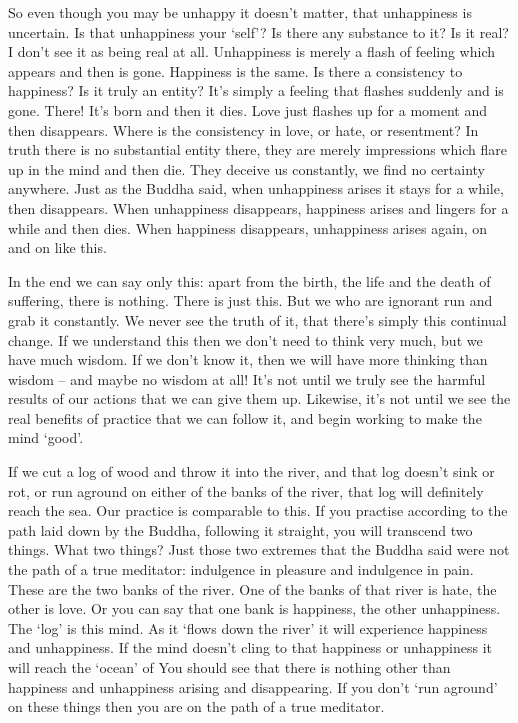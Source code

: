 So even though you may be unhappy it doesn't matter, that unhappiness is uncertain. Is that unhappiness your `self'? Is there any substance to it? Is it real? I don't see it as being real at all. Unhappiness is merely a flash of feeling which appears and then is gone. Happiness is the same. Is there a consistency to happiness? Is it truly an entity? It's simply a feeling that flashes suddenly and is gone. There! It's born and then it dies. Love just flashes up for a moment and then disappears. Where is the consistency in love, or hate, or resentment? In truth there is no substantial entity there, they are merely impressions which flare up in the mind and then die. They deceive us constantly, we find no certainty anywhere. Just as the Buddha said, when unhappiness arises it stays for a while, then disappears. When unhappiness disappears, happiness arises and lingers for a while and then dies. When happiness disappears, unhappiness arises again, on and on like this. 

In the end we can say only this: apart from the birth, the life and the death of suffering, there is nothing. There is just this. But we who are ignorant run and grab it constantly. We never see the truth of it, that there's simply this continual change. If we understand this then we don't need to think very much, but we have much wisdom. If we don't know it, then we will have more thinking than wisdom -- and maybe no wisdom at all! It's not until we truly see the harmful results of our actions that we can give them up. Likewise, it's not until we see the real benefits of practice that we can follow it, and begin working to make the mind `good'. 

If we cut a log of wood and throw it into the river, and that log doesn't sink or rot, or run aground on either of the banks of the river, that log will definitely reach the sea. Our practice is comparable to this. If you practise according to the path laid down by the Buddha, following it straight, you will transcend two things. What two things? Just those two extremes that the Buddha said were not the path of a true meditator: indulgence in pleasure and indulgence in pain. These are the two banks of the river. One of the banks of that river is hate, the other is love. Or you can say that one bank is happiness, the other unhappiness. The `log' is this mind. As it `flows down the river' it will experience happiness and unhappiness. If the mind doesn't cling to that happiness or unhappiness it will reach the `ocean' of  You should see that there is nothing other than happiness and unhappiness arising and disappearing. If you don't `run aground' on these things then you are on the path of a true meditator. 

